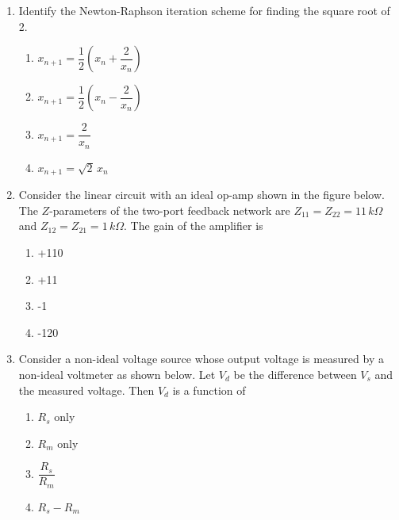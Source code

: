 \documentclass[journal]{IEEEtran}
\begin{document}
\begin{enumerate}
\item Identify the Newton-Raphson iteration scheme for finding the square root of 2.  
\begin{multicols}{2}
\begin{enumerate}
\item $x_{n+1} = \dfrac{1}{2} \left(x_n + \dfrac{2}{x_n}\right)$  
\item $x_{n+1} = \dfrac{1}{2} \left(x_n - \dfrac{2}{x_n}\right)$  
\item $x_{n+1} = \dfrac{2}{x_n}$  
\item $x_{n+1} = \sqrt{2}\,x_n$  
\end{enumerate}
\end{multicols}


\item Consider the linear circuit with an ideal op-amp shown in the figure below.  
The $Z$-parameters of the two-port feedback network are $Z_{11} = Z_{22} = 11 \, k\Omega$ and $Z_{12} = Z_{21} = 1 \, k\Omega$. The gain of the amplifier is  
\begin{multicols}{4}
\begin{enumerate}
\item +110  
\item +11  
\item -1  
\item -120  
\end{enumerate}
\end{multicols}


\item Consider a non-ideal voltage source whose output voltage is measured by a non-ideal voltmeter as shown below.  
Let $V_d$ be the difference between $V_s$ and the measured voltage. Then $V_d$ is a function of  
\begin{multicols}{2}
\begin{enumerate}
\item $R_s$ only  
\item $R_m$ only  
\item $\dfrac{R_s}{R_m}$  
\item $R_s - R_m$  
\end{enumerate}
\end{multicols}



\end{enumerate}
\end{document}
